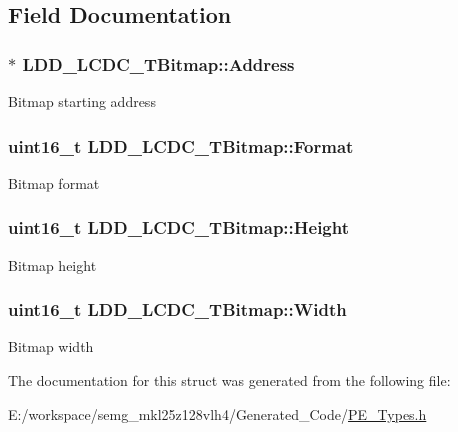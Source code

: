 \subsection{Field Documentation}
\hypertarget{struct_l_d_d___l_c_d_c___t_bitmap_a5501acee73fa929201a06eccc4821a7a}{
\subsubsection[{Address}]{$\ast$ L\-D\-D\-\_\-\-L\-C\-D\-C\-\_\-\-T\-Bitmap\-::\-Address}}\label{struct_l_d_d___l_c_d_c___t_bitmap_a5501acee73fa929201a06eccc4821a7a}
Bitmap starting address \hypertarget{struct_l_d_d___l_c_d_c___t_bitmap_a8f886a6ce6e67d4b070c20bdd5ce495a}{
\subsubsection[{Format}]{\setlength{\rightskip}{0pt plus 5cm}uint16\-\_\-t L\-D\-D\-\_\-\-L\-C\-D\-C\-\_\-\-T\-Bitmap\-::\-Format}}\label{struct_l_d_d___l_c_d_c___t_bitmap_a8f886a6ce6e67d4b070c20bdd5ce495a}
Bitmap format \hypertarget{struct_l_d_d___l_c_d_c___t_bitmap_a13fea31674709c4f681e6c86d3b71206}{
\subsubsection[{Height}]{\setlength{\rightskip}{0pt plus 5cm}uint16\-\_\-t L\-D\-D\-\_\-\-L\-C\-D\-C\-\_\-\-T\-Bitmap\-::\-Height}}\label{struct_l_d_d___l_c_d_c___t_bitmap_a13fea31674709c4f681e6c86d3b71206}
Bitmap height \hypertarget{struct_l_d_d___l_c_d_c___t_bitmap_af88017bd29e49292265c1fda6dc5463d}{
\subsubsection[{Width}]{\setlength{\rightskip}{0pt plus 5cm}uint16\-\_\-t L\-D\-D\-\_\-\-L\-C\-D\-C\-\_\-\-T\-Bitmap\-::\-Width}}\label{struct_l_d_d___l_c_d_c___t_bitmap_af88017bd29e49292265c1fda6dc5463d}
Bitmap width 

The documentation for this struct was generated from the following file\-:\begin{DoxyCompactItemize}
\item 
E\-:/workspace/semg\-\_\-mkl25z128vlh4/\-Generated\-\_\-\-Code/\hyperlink{_p_e___types_8h}{P\-E\-\_\-\-Types.\-h}\end{DoxyCompactItemize}
